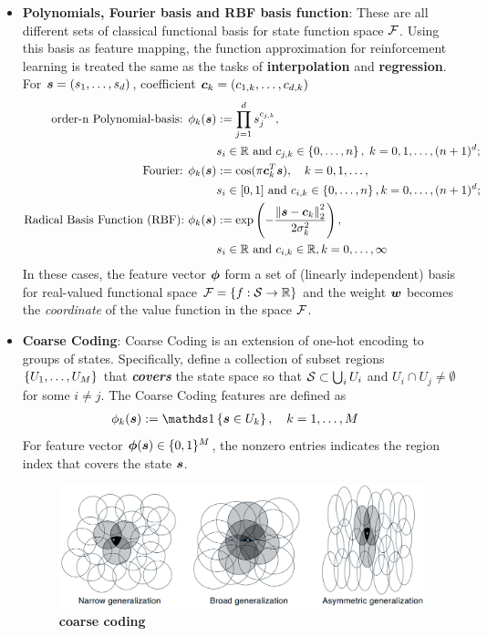 \documentclass[11pt]{article}
\begin{document}
\begin{itemize}
\item \textbf{Polynomials, Fourier basis and RBF basis function}:  These are all different sets of classical functional basis for state function space ${\mathcal F}$.  Using this basis as feature mapping, the function approximation for reinforcement learning is treated the same as the tasks of \textbf{interpolation} and \textbf{regression}. For $\boldsymbol{s} = (s_{1}, \ldots, s_{d})$, coefficient $\boldsymbol{c}_{k} = (c_{1,k}, \ldots, c_{d,k})$
\begin{align*}
\text{order-n Polynomial-basis: }\phi_{k}(\boldsymbol{s}) &:= \prod_{j=1}^{d}s_{j}^{c_{j,k}},\\
&s_{i} \in {\mathbb R} \text{ and } c_{j,k} \in \left\{0,\ldots, n\right\},\;k=0,1,\ldots, (n+1)^d; \\
\text{Fourier: }\phi_{k}(\boldsymbol{s}) &:= \cos(\pi \boldsymbol{c}_{k}^{T}\boldsymbol{s}), \quad k=0,1,\ldots, \\
&s_{i} \in [0,1]\text{ and }c_{i,k} \in \left\{0,\ldots, n\right\}, k= 0, \ldots, (n+1)^d;\\
\text{Radical Basis Function (RBF): }\phi_{k}(\boldsymbol{s}) &:= \exp\left(-\frac{\left\|\boldsymbol{s} - \boldsymbol{c}_{k}\right\|_{2}^{2}}{2\sigma_{k}^{2}}\right),\\
&s_{i} \in  {\mathbb R}\text{ and }c_{i,k} \in  {\mathbb R}, k= 0, \ldots, \infty
\end{align*}  In these cases, the feature vector $\boldsymbol{\phi}$ form a set of (linearly independent) basis for real-valued functional space ${\mathcal F}=\left\{f: {\mathcal S} \rightarrow {\mathbb R}\right\}$ and the weight $\boldsymbol{w}$ becomes the \emph{coordinate} of the value function in the space ${\mathcal F}$.



\item \textbf{Coarse Coding}: Coarse Coding is an extension of one-hot encoding to groups of states. Specifically, define a collection of subset regions $\left\{U_{1}, \ldots, U_{M}\right\}$ that \emph{\textbf{covers}} the state space so that ${\mathcal S} \subset \bigcup_{i}U_{i}$ and $U_{i}\cap U_{j} \neq \emptyset$ for some $i\neq j$. The Coarse Coding features are defined as 
\begin{align*}
\phi_{k}(\mb{s}) &:= \ind{\mb{s} \in U_{k}}, \quad k=1,\ldots, M 
\end{align*} For feature vector $\boldsymbol{\phi}(\boldsymbol{s}) \in \{0,1\}^{M}$, the nonzero entries indicates the region index that covers the state $\boldsymbol{s}$.  
\begin{figure}
\begin{minipage}[t]{1\linewidth}
  \centering
  \centerline{\includegraphics[scale = 0.3]{coarse_coding.png}}
\end{minipage}
\caption{\footnotesize{\textbf{coarse coding}}}
\label{fig: coarse_coding}
\end{figure}


\end{itemize}
\end{document}
